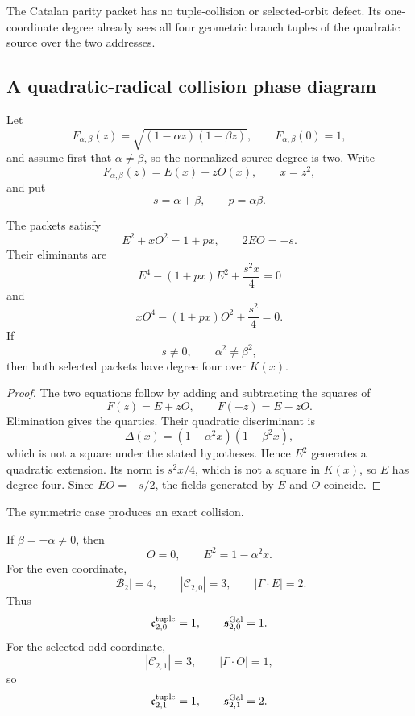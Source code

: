 The Catalan parity packet has no tuple-collision or selected-orbit defect.  Its one-coordinate degree already sees all four geometric branch tuples of the quadratic source over the two addresses.

\subsection{A quadratic-radical collision phase diagram}
\label{subsec:block10-quadratic-radical}

Let
\[
 F_{\alpha,\beta}(z)
 =
 \sqrt{(1-\alpha z)(1-\beta z)},
 \qquad
 F_{\alpha,\beta}(0)=1,
\]
and assume first that $\alpha\neq\beta$, so the normalized source degree is two.  Write
\[
 F_{\alpha,\beta}(z)=E(x)+zO(x),
 \qquad
 x=z^2,
\]
and put
\[
 s=\alpha+\beta,
 \qquad
 p=\alpha\beta.
\]

\begin{theorem}
\label{thm:block10-radical-packets}
The packets satisfy
\[
 \boxed{
 E^2+xO^2=1+px,
 \qquad
 2EO=-s.}
\]
Their eliminants are
\[
 \boxed{
 E^4-(1+px)E^2+\frac{s^2x}{4}=0}
\]
and
\[
 \boxed{
 xO^4-(1+px)O^2+\frac{s^2}{4}=0.}
\]
If
\[
 s\neq0,
 \qquad
 \alpha^2\neq\beta^2,
\]
then both selected packets have degree four over $K(x)$.
\end{theorem}

\begin{proof}
The two equations follow by adding and subtracting the squares of
\[
 F(z)=E+zO,
 \qquad
 F(-z)=E-zO.
\]
Elimination gives the quartics.  Their quadratic discriminant is
\[
 \Delta(x)
 =
 (1-\alpha^2x)(1-\beta^2x),
\]
which is not a square under the stated hypotheses.  Hence $E^2$ generates a quadratic extension.  Its norm is $s^2x/4$, which is not a square in $K(x)$, so $E$ has degree four.  Since $EO=-s/2$, the fields generated by $E$ and $O$ coincide.
\end{proof}

The symmetric case produces an exact collision.

\begin{corollary}
\label{cor:block10-antisymmetric-collision}
If $\beta=-\alpha\neq0$, then
\[
 \boxed{O=0,
 \qquad
 E^2=1-\alpha^2x.}
\]
For the even coordinate,
\[
 |\mathcal B_2|=4,
 \qquad
 |\mathcal C_{2,0}|=3,
 \qquad
 |\Gamma\cdot E|=2.
\]
Thus
\[
 \mathfrak c^{\rm tuple}_{2,0}=1,
 \qquad
 \mathfrak s^{\rm Gal}_{2,0}=1.
\]
For the selected odd coordinate,
\[
 |\mathcal C_{2,1}|=3,
 \qquad
 |\Gamma\cdot O|=1,
\]
so
\[
 \mathfrak c^{\rm tuple}_{2,1}=1,
 \qquad
 \mathfrak s^{\rm Gal}_{2,1}=2.
\]
\end{corollary}

